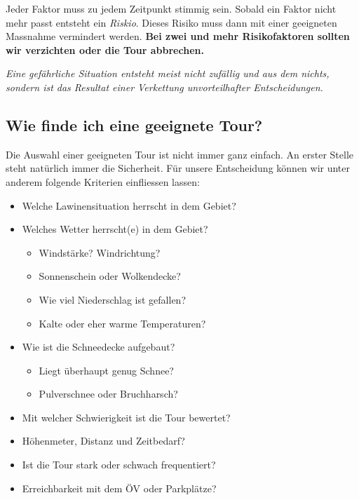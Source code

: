Jeder Faktor muss zu jedem Zeitpunkt stimmig sein.
Sobald ein Faktor nicht mehr passt entsteht ein \textit{Riskio}.
Dieses Risiko muss dann mit einer geeigneten Massnahme vermindert werden.
\textbf{Bei zwei und mehr Risikofaktoren sollten wir verzichten oder die Tour abbrechen.}

\textit{Eine gefährliche Situation entsteht meist nicht zufällig und aus dem nichts, sondern ist das Resultat einer Verkettung unvorteilhafter Entscheidungen.}

\newcolumn

\subsection{Wie finde ich eine geeignete Tour?}

Die Auswahl einer geeigneten Tour ist nicht immer ganz einfach.
An erster Stelle steht natürlich immer die Sicherheit.
Für unsere Entscheidung können wir unter anderem folgende Kriterien einfliessen lassen:

\begin{itemize}
  \item{Welche Lawinensituation herrscht in dem Gebiet?}
  \item{
    Welches Wetter herrscht(e) in dem Gebiet?
    \begin{itemize}
      \item{Windstärke? Windrichtung?}
      \item{Sonnenschein oder Wolkendecke?}
      \item{Wie viel Niederschlag ist gefallen?}
      \item{Kalte oder eher warme Temperaturen?}
    \end{itemize}
  }
  \item{
    Wie ist die Schneedecke aufgebaut?
    \begin{itemize}
      \item{Liegt überhaupt genug Schnee?}
      \item{Pulverschnee oder Bruchharsch?}
    \end{itemize}
  }
  \item{Mit welcher Schwierigkeit ist die Tour bewertet?}
  \item{Höhenmeter, Distanz und Zeitbedarf?}
  \item{Ist die Tour stark oder schwach frequentiert?}
  \item{Erreichbarkeit mit dem ÖV oder Parkplätze?}
\end{itemize}

